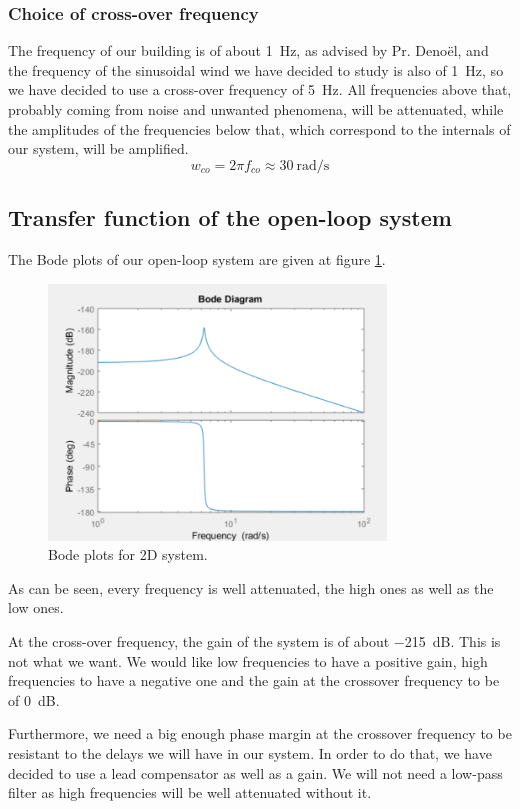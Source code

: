 \subsubsection{Choice of cross-over frequency}
The frequency of our building is of about \SI{1}{\hertz}, as advised by Pr. Denoël, and the frequency of the sinusoidal wind we have decided to study is also of \SI{1}{\hertz}, so we have decided to use a cross-over frequency of \SI{5}{\hertz}. All frequencies above that, probably coming from noise and unwanted phenomena, will be attenuated, while the amplitudes of the frequencies below that, which correspond to the internals of our system, will be amplified.
$$
w_{co} = 2\pi f_{co} \approx \SI{30}{\radian\per\second}
$$

\subsection{Transfer function of the open-loop system}
The Bode plots of our open-loop system are given at figure \ref{fig:bode-ol}.
\begin{figure}[H]
    \centering
    \includegraphics[width=0.8\textwidth]{resources/png/bode-ol.png}
    \caption{Bode plots for 2D system.}
    \label{fig:bode-ol}
\end{figure}
As can be seen, every frequency is well attenuated, the high ones as well as the low ones.\par
At the cross-over frequency, the gain of the system is of about \SI{-215}{\deci\bel}. This is not what we want. We would like low frequencies to have a positive gain, high frequencies to have a negative one and the gain at the crossover frequency to be of \SI{0}{\deci\bel}.\par
Furthermore, we need a big enough phase margin at the crossover frequency to be resistant to the delays we will have in our system. In order to do that, we have decided to use a lead compensator as well as a gain. We will not need a low-pass filter as high frequencies will be well attenuated without it.

